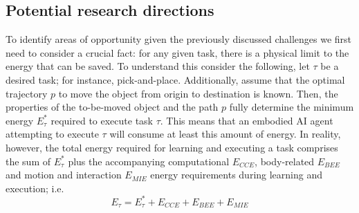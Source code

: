 \subsection{Potential research directions}
To identify areas of opportunity given the previously discussed challenges we first need to consider a crucial fact: for any given task, there is a physical limit to the energy that can be saved. To understand this consider the following, let $\tau$ be a desired task; for instance, pick-and-place. Additionally, assume that the optimal trajectory $p$ to move the object from origin to destination is known. Then, the properties of the to-be-moved object and the path $p$ fully determine the minimum energy $E^*_{\tau}$ required to execute task $\tau$. This means that an embodied AI agent attempting to execute $\tau$ will consume at least this amount of energy. In reality, however, the total energy required for learning and executing a task comprises the sum of $E^*_{\tau}$ plus the accompanying computational $E_{CCE}$, body-related $E_{BEE}$ and motion and interaction $E_{MIE}$ energy requirements during learning and execution; i.e.
\begin{equation}
     E_{\tau} =  E^*_{\tau} +  E_{CCE} +  E_{BEE} +  E_{MIE}
\end{equation}
